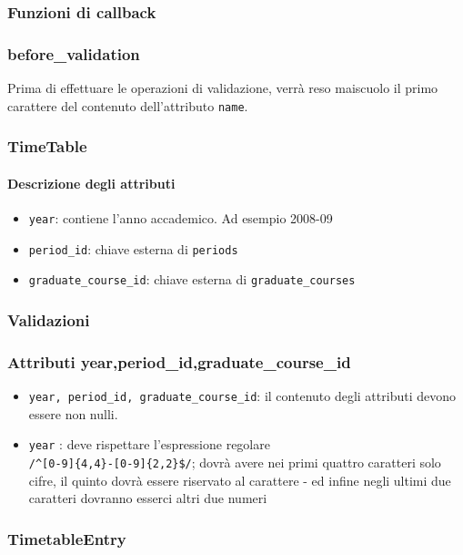 \documentclass[11pt,a4paper]{article}
\begin{document}
\subsubsection*{Funzioni di callback}
\subsubsection*{before\_validation}
Prima di effettuare le operazioni di validazione, verrà reso maiscuolo il primo carattere del contenuto dell'attributo \verb|name|.
\subsubsection{TimeTable}
\paragraph{Descrizione degli attributi}
 \begin{itemize}
  \item \verb|year|: contiene l'anno accademico. Ad esempio 2008-09
  \item \verb|period_id|: chiave esterna di \verb|periods|
  \item \verb|graduate_course_id|: chiave esterna di \verb|graduate_courses|
 \end{itemize}
\subsubsection*{Validazioni}
\subsubsection*{Attributi year,period\_id,graduate\_course\_id}
\begin{itemize}
 \item \verb|year, period_id, graduate_course_id|: il contenuto degli attributi devono essere non nulli.
 \item \verb|year| : deve rispettare l'espressione regolare\\ \verb|/^[0-9]{4,4}-[0-9]{2,2}$/|; dovrà avere nei primi quattro caratteri solo cifre, il quinto dovrà essere riservato al carattere - ed infine negli ultimi due caratteri dovranno esserci altri due numeri
\end{itemize}
\subsubsection{TimetableEntry}
\end{document}
